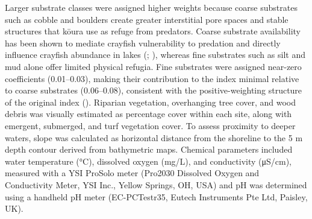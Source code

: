 \documentclass[
  letterpaper,
  DIV=11,
  numbers=noendperiod]{scrartcl}
\begin{document}
Larger substrate classes were assigned higher weights because coarse
substrates such as cobble and boulders create greater interstitial pore
spaces and stable structures that kōura use as refuge from predators.
Coarse substrate availability has been shown to mediate crayfish
vulnerability to predation and directly influence crayfish abundance in
lakes (;
), whereas fine
substrates such as silt and mud alone offer limited physical refugia.
Fine substrates were assigned near-zero coefficients (0.01--0.03),
making their contribution to the index minimal relative to coarse
substrates (0.06--0.08), consistent with the positive-weighting
structure of the original index (). Riparian vegetation, overhanging tree cover, and
wood debris was visually estimated as percentage cover within each site,
along with emergent, submerged, and turf vegetation cover. To assess
proximity to deeper waters, slope was calculated as horizontal distance
from the shoreline to the 5 m depth contour derived from bathymetric
maps. Chemical parameters included water temperature (°C), dissolved
oxygen (mg/L), and conductivity (μS/cm), measured with a YSI ProSolo
meter (Pro2030 Dissolved Oxygen and Conductivity Meter, YSI Inc., Yellow
Springs, OH, USA) and pH was determined using a handheld pH meter
(EC-PCTestr35, Eutech Instruments Pte Ltd, Paisley, UK).
\end{document}

